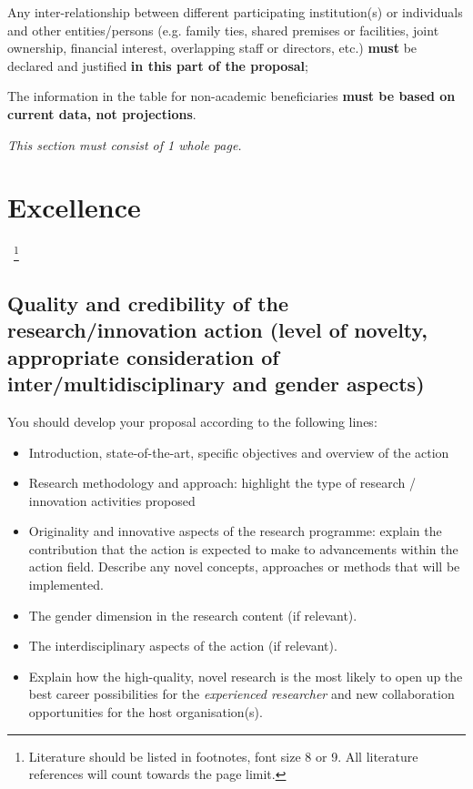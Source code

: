 \noindent
Any inter-relationship between different participating institution(s) or individuals and other entities/persons (e.g. family ties, shared premises or facilities, joint ownership, financial interest, overlapping staff or directors, etc.) \textbf{must} be declared and justified \textbf{in this part of the proposal};

\medskip\noindent
The information in the table for non-academic beneficiaries \textbf{must be based on current data, not projections}.

\medskip\noindent
\emph{This section must consist of 1 whole page.}


\newpage
\markStartPageLimit
\section{Excellence}
\label{sec:excellence}
~\footnote{Literature should be listed in footnotes, font size 8 or 9.
All literature references will count towards the page limit.}

\subsection{Quality and credibility of the research/innovation action (level of novelty, appropriate consideration of inter/multidisciplinary and gender aspects)}
\label{sec:excellence_quality}

You should develop your proposal according to the following lines:
\begin{itemize}
  \item Introduction, state-of-the-art, specific objectives and overview of the action
  \item Research methodology and approach: highlight the type of research / innovation activities proposed
  \item Originality and innovative aspects of the research programme: explain the contribution that the action is expected to make to advancements within the action field. Describe any novel concepts, approaches or methods that will be implemented.
 \item The gender dimension in the research content (if relevant).

\setlength{\fboxsep}{1mm}

 \item The interdisciplinary aspects of the action (if relevant).
 \item Explain how the high-quality, novel research is the most likely to open up the best career possibilities for the {\em experienced researcher} and new collaboration opportunities for the host organisation(s). 
\end{itemize}




